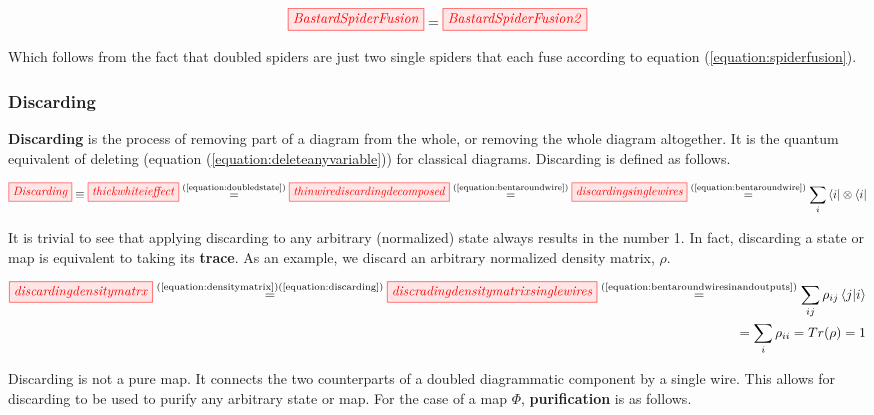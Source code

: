 \documentclass[]{article}
\newcommand{\equaltext}[1]{\ensuremath{\stackrel{\text{#1}}{=}}}
\begin{document}
\begin{equation}
\label{equation:bastardspiderfusion}
	\tikzfig{BastardSpiderFusion} = \tikzfig{BastardSpiderFusion2}
\end{equation}

Which follows from the fact that doubled spiders are just two single spiders that each fuse according to equation (\ref{equation:spiderfusion}).
\subsubsection{Discarding}
\label{discarding}

\textbf{Discarding} is the process of removing part of a diagram from the whole, or removing the whole diagram altogether. It is the quantum equivalent of deleting (equation (\ref{equation:deleteanyvariable})) for classical diagrams. Discarding is defined as follows.

\begin{equation}
\label{equation:discarding}
\tikzfig{Discarding} \equiv \tikzfig{thickwhiteieffect} \equaltext{(\ref{equation:doubledstate})} \tikzfig{thinwirediscardingdecomposed} 
\equaltext{(\ref{equation:bentaroundwire})}
 \tikzfig{discardingsinglewires} \equaltext{(\ref{equation:bentaroundwire})} \sum\limits_{i}\bra{i}\otimes\bra{i}
\end{equation}

It is trivial to see that applying discarding to any arbitrary (normalized) state always results in the number 1. In fact, discarding a state or map is equivalent to taking its \textbf{trace}. As an example, we discard an arbitrary normalized density matrix, $\rho$.

\begin{equation}
\label{equation:discardingstate}
\begin{split}
\tikzfig{discardingdensitymatrx} \equaltext{(\ref{equation:densitymatrix})(\ref{equation:discarding})} \tikzfig{discradingdensitymatrixsinglewires} \equaltext{(\ref{equation:bentaroundwiresinandoutputs})} \sum\limits_{ij} \rho_{ij} \bra{j}\ket{i} \\ = \sum\limits_{i} \rho_{ii} = Tr(\rho) = 1
\end{split}
\end{equation}

Discarding is not a pure map. It connects the two counterparts of a doubled diagrammatic component by a single wire. This allows for discarding to be used to purify any arbitrary state or map. For the case of a map $\Phi$, \textbf{purification} is as follows.
\end{document}
